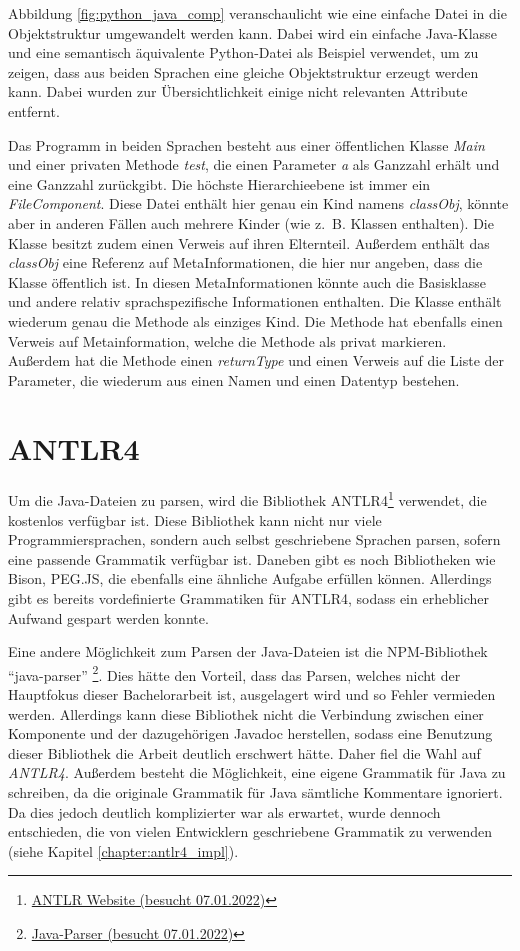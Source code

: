 Abbildung \ref{fig:python_java_comp} veranschaulicht wie eine einfache Datei in die Objektstruktur umgewandelt werden kann. Dabei wird ein einfache Java-Klasse und eine semantisch äquivalente Python-Datei als Beispiel verwendet, um zu zeigen, dass aus beiden Sprachen eine gleiche Objektstruktur erzeugt werden kann. Dabei wurden zur Übersichtlichkeit einige nicht relevanten Attribute entfernt.

Das Programm in beiden Sprachen besteht aus einer öffentlichen Klasse \textit{Main} und einer privaten Methode \textit{test}, die einen Parameter \textit{a} als Ganzzahl erhält und eine Ganzzahl zurückgibt. Die höchste Hierarchieebene ist immer ein \textit{FileComponent}. Diese Datei enthält hier genau ein Kind namens \textit{classObj}, könnte aber in anderen Fällen auch mehrere Kinder (wie z.~B. Klassen enthalten). Die Klasse besitzt zudem einen Verweis auf ihren Elternteil. Außerdem enthält das \textit{classObj} eine Referenz auf MetaInformationen, die hier nur angeben, dass die Klasse öffentlich ist. In diesen MetaInformationen könnte auch die Basisklasse und andere relativ sprachspezifische Informationen enthalten. Die Klasse enthält wiederum genau die Methode als einziges Kind. Die Methode hat ebenfalls einen Verweis auf Metainformation, welche die Methode als privat markieren. Außerdem hat die Methode einen \textit{returnType} und einen Verweis auf die Liste der Parameter, die wiederum aus einen Namen und einen Datentyp bestehen.

\section{ANTLR4}
Um die Java-Dateien zu parsen, wird die Bibliothek ANTLR4\footnote{\href{https://www.antlr.org/}{ANTLR Website (besucht 07.01.2022)}} verwendet, die kostenlos verfügbar ist. Diese Bibliothek kann nicht nur viele Programmiersprachen, sondern auch selbst geschriebene Sprachen parsen, sofern eine passende Grammatik verfügbar ist. Daneben gibt es noch Bibliotheken wie Bison, PEG.JS, die ebenfalls eine ähnliche Aufgabe erfüllen können. Allerdings gibt es bereits vordefinierte Grammatiken für ANTLR4, sodass ein erheblicher Aufwand gespart werden konnte.  

Eine andere Möglichkeit zum Parsen der Java-Dateien ist die NPM-Bibliothek \enquote{java-parser} \footnote{\href{https://www.npmjs.com/package/java-parser}{Java-Parser (besucht 07.01.2022)}}. Dies hätte den Vorteil, dass das Parsen, welches nicht der Hauptfokus dieser Bachelorarbeit ist, ausgelagert wird und so Fehler vermieden werden. Allerdings kann diese Bibliothek nicht die Verbindung zwischen einer Komponente und der dazugehörigen Javadoc herstellen, sodass eine Benutzung dieser Bibliothek die Arbeit deutlich erschwert hätte. Daher fiel die Wahl auf \textit{ANTLR4}. Außerdem besteht die Möglichkeit, eine eigene Grammatik für Java zu schreiben, da die originale Grammatik für Java sämtliche Kommentare ignoriert. Da dies jedoch deutlich komplizierter war als erwartet, wurde dennoch entschieden, die von vielen Entwicklern geschriebene Grammatik zu verwenden (siehe Kapitel \ref{chapter:antlr4_impl}).

